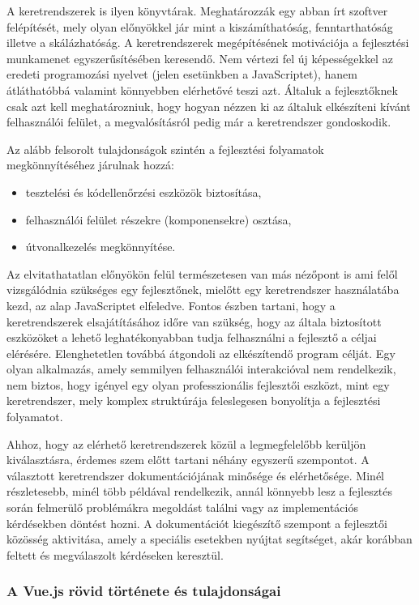 \documentclass[12pt]{article}
\begin{document}
A keretrendszerek is ilyen könyvtárak. Meghatározzák egy abban írt szoftver felépítését, mely olyan előnyökkel jár mint a kiszámíthatóság, fenntarthatóság illetve a skálázhatóság.
A keretrendszerek megépítésének motivációja a fejlesztési munkamenet egyszerűsítésében keresendő. Nem vértezi fel új képességekkel az eredeti programozási nyelvet (jelen esetünkben a JavaScriptet), hanem átláthatóbbá valamint könnyebben elérhetővé teszi azt. Általuk a fejlesztőknek csak azt kell meghatározniuk, hogy hogyan nézzen ki az általuk elkészíteni kívánt felhasználói felület, a megvalósításról pedig már a keretrendszer gondoskodik.

Az alább felsorolt tulajdonságok szintén a fejlesztési folyamatok megkönnyítéséhez járulnak hozzá:
\begin{itemize}
\item tesztelési és kódellenőrzési eszközök biztosítása,
\item felhasználói felület részekre (komponensekre) osztása,
\item útvonalkezelés megkönnyítése.
\end{itemize}

Az elvitathatatlan előnyökön felül természetesen van más nézőpont is ami felől vizsgálódnia szükséges egy fejlesztőnek, mielőtt egy keretrendszer használatába kezd, az alap JavaScriptet elfeledve. Fontos észben tartani, hogy a keretrendszerek elsajátításához időre van szükség, hogy az általa biztosított eszközöket a lehető leghatékonyabban tudja felhasználni a fejlesztő a céljai elérésére. Elenghetetlen továbbá átgondoli az elkészítendő program célját. Egy olyan alkalmazás, amely semmilyen felhasználói interakcióval nem rendelkezik, nem biztos, hogy igényel egy olyan professzionális fejlesztői eszközt, mint egy keretrendszer, mely komplex struktúrája feleslegesen bonyolítja a fejlesztési folyamatot.

Ahhoz, hogy az elérhető keretrendszerek közül a legmegfelelőbb kerüljön kiválasztásra, érdemes szem előtt tartani néhány egyszerű szempontot. A választott keretrendszer dokumentációjának minősége és elérhetősége. Minél részletesebb, minél több példával rendelkezik, annál könnyebb lesz a fejlesztés során felmerülő problémákra megoldást találni vagy az implementációs kérdésekben döntést hozni. A dokumentációt kiegészítő szempont a fejlesztői közösség aktivitása, amely a speciális esetekben nyújtat segítséget, akár korábban feltett és megválaszolt kérdéseken keresztül.

\subsubsection{A Vue.js rövid története és tulajdonságai}
\end{document}
